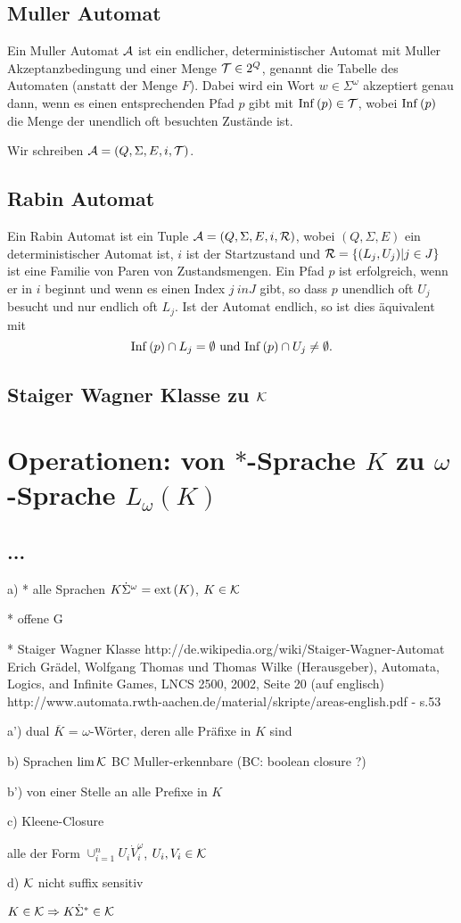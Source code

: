 \subsection{Muller Automat}
Ein Muller Automat $\mathcal{A}$ ist ein endlicher, deterministischer Automat mit Muller Akzeptanzbedingung und einer Menge $\mathcal{T} \in 2^Q$, genannt die Tabelle des Automaten (anstatt der Menge $F$). Dabei wird ein Wort $w \in \Sigma^\omega$ akzeptiert genau dann, wenn es einen entsprechenden Pfad $p$ gibt mit ${\mathrm{Inf}}\,(p) \in \mathcal{T}$, wobei ${\mathrm{Inf}}\,(p)$ die Menge der unendlich oft besuchten Zustände ist.

Wir schreiben $\mathcal{A} = (Q, \Sigma, E, i, \mathcal{T})$.

\subsection{Rabin Automat}
Ein Rabin Automat ist ein Tuple $\mathcal{A} = (Q, \Sigma, E, i, \mathcal{R})$, wobei $(Q,\Sigma,E)$ ein deterministischer Automat ist, $i$ ist der Startzustand und $\mathcal{R} = \{(L_j, U_j) | j \in J\}$ ist eine Familie von Paren von Zustandsmengen. Ein Pfad $p$ ist erfolgreich, wenn er in $i$ beginnt und wenn es einen Index $j \ in J$ gibt, so dass $p$ unendlich oft $U_j$ besucht und nur endlich oft $L_j$. Ist der Automat endlich, so ist dies äquivalent mit
\[ \Inf(p) \cap L_j = \emptyset \ \text{und} \ \Inf(p) \cap U_j \neq \emptyset . \]

\subsection{Staiger Wagner Klasse zu $\mathcal{K}$}

\section{Operationen: von $*$-Sprache $K$ zu $\omega$-Sprache $L_\omega (K)$}
\subsection{...}
a)
* alle Sprachen $K \dot \Sigma^\omega = {\mathrm{ext}}\,(K)$, $K \in \mathcal{K}$

* offene G

* Staiger Wagner Klasse
http://de.wikipedia.org/wiki/Staiger-Wagner-Automat
Erich Grädel, Wolfgang Thomas und Thomas Wilke (Herausgeber), Automata, Logics, and Infinite Games, LNCS 2500, 2002, Seite 20 (auf englisch)
http://www.automata.rwth-aachen.de/material/skripte/areas-english.pdf - s.53

a')
dual $\overline{K}$ = $\omega$-Wörter, deren alle Präfixe in $K$ sind

b) Sprachen $\lim \mathcal{K}$
BC Muller-erkennbare
(BC: boolean closure ?)

b') von einer Stelle an alle Prefixe in $K$

c) Kleene-Closure

alle der Form $\cup_{i=1}^n U_i \dot V_i^\omega$, $U_i, V_i \in \mathcal{K}$

d) $\mathcal{K}$ nicht suffix sensitiv

$K \in \mathcal{K} \Rightarrow K \dot \Sigma^* \in \mathcal{K}$  
